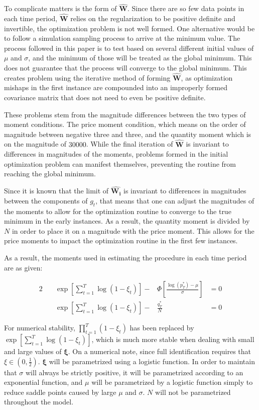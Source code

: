 \documentclass[12pt, letterpaper]{paper}
\begin{document}
To complicate matters is the form of $\widehat{\bm{W}}$. Since there are so few
data points in each time period, $\widehat{\bm{W}}$ relies on the
regularization to be positive definite and invertible, the optimization problem is
not well formed. One alternative would be to follow a simulation
sampling process to arrive at the minimum value. The process followed
in this paper is to test based on several different initial values of
$\mu$ and $\sigma$, and the minimum of those will be treated as the global
minimum. This does not guarantee that the process will converge to the
global minimum.  This creates problem using the iterative method of
forming $\widehat{\bm{W}}$, as optimization mishaps in the first instance are
compounded into an improperly formed covariance matrix that does not
need to even be positive definite.

These problems stem from the magnitude differences between the two
types of moment conditions. The price moment condition, which means on
the order of magnitude between negative three and three, and the quantity moment which
is on the magnitude of $30000$. While the final iteration of $\widehat{\bm{W}}$ is
invariant to differences in magnitudes of the moments, problems formed
in the initial optimization problem can manifest themselves, preventing
the routine from reaching the global minimum.

Since it is known that the limit of $\widehat{\bm{W_i}}$ is invariant
to differences in magnitudes between the components of $g_t$,
that means that one can adjust the magnitudes of the moments to allow
for the optimization routine to converge to the true minimum in the
early instances. As a result, the quantity moment is divided by $N$ in
order to place it on a magnitude with the price moment. This allows
for the price moments to impact the optimization routine in the first
few instances.

As a result, the moments used in estimating the procedure in each time
period are as given:

\begin{alignat*}{2}
 \quad & \exp \left [ \sum_{t=1}^T \log ( 1 - \xi_t ) \right ] - &\Phi \left [ \frac{ \log ( p_T^* ) - \mu }{ \sigma }  \right ] &= 0 \\        
 \quad & \exp \left [ \sum_{t=1}^T \log ( 1 - \xi_t ) \right ] - &\frac{q_T^*}{N} 
    &= 0
\end{alignat*}

For numerical stability, $\prod_{t=1}^T ( 1 - \xi_t )$ has been replaced by $\exp
\left [ \sum_{t=1}^T \log ( 1 - \xi_t ) \right ]$, which is much more stable when
dealing with small and large values of $\bm{\xi}$. On a numerical note, since
full identification requires that $\xi \in (0,\frac{1}{2})$. $\bm{\xi}$ will be
parametrized using a logistic function. In order to maintain that $\sigma$
will always be strictly positive, it will be parametrized according to
an exponential function, and $\mu$ will be parametrized by a logistic
function simply to reduce saddle points caused by large $\mu$ and $\sigma$. $N$
will not be parametrized throughout the model.
\end{document}
